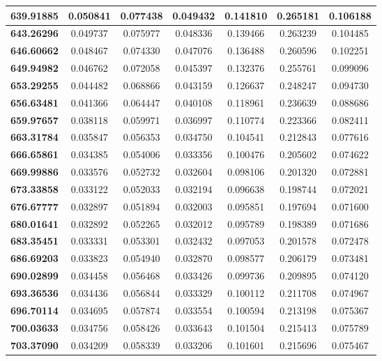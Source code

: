 \documentclass[10pt, a4paper]{article}
\begin{document}
\begin{appendices}
\begin{longtable}{|c|c|c|c|c|c|c|}
\textbf{639.91885} & 0.050841 & 0.077438 & 0.049432 & 0.141810 & 0.265181 & 0.106188 \\ \hline
\textbf{643.26296} & 0.049737 & 0.075977 & 0.048336 & 0.139466 & 0.263239 & 0.104485 \\ \hline
\textbf{646.60662} & 0.048467 & 0.074330 & 0.047076 & 0.136488 & 0.260596 & 0.102251 \\ \hline
\textbf{649.94982} & 0.046762 & 0.072058 & 0.045397 & 0.132376 & 0.255761 & 0.099096 \\ \hline
\textbf{653.29255} & 0.044482 & 0.068866 & 0.043159 & 0.126637 & 0.248247 & 0.094730 \\ \hline
\textbf{656.63481} & 0.041366 & 0.064447 & 0.040108 & 0.118961 & 0.236639 & 0.088686 \\ \hline
\textbf{659.97657} & 0.038118 & 0.059971 & 0.036997 & 0.110774 & 0.223366 & 0.082411 \\ \hline
\textbf{663.31784} & 0.035847 & 0.056353 & 0.034750 & 0.104541 & 0.212843 & 0.077616 \\ \hline
\textbf{666.65861} & 0.034385 & 0.054006 & 0.033356 & 0.100476 & 0.205602 & 0.074622 \\ \hline
\textbf{669.99886} & 0.033576 & 0.052732 & 0.032604 & 0.098106 & 0.201320 & 0.072881 \\ \hline
\textbf{673.33858} & 0.033122 & 0.052033 & 0.032194 & 0.096638 & 0.198744 & 0.072021 \\ \hline
\textbf{676.67777} & 0.032897 & 0.051894 & 0.032003 & 0.095851 & 0.197694 & 0.071600 \\ \hline
\textbf{680.01641} & 0.032892 & 0.052265 & 0.032012 & 0.095789 & 0.198389 & 0.071686 \\ \hline
\textbf{683.35451} & 0.033331 & 0.053301 & 0.032432 & 0.097053 & 0.201578 & 0.072478 \\ \hline
\textbf{686.69203} & 0.033823 & 0.054940 & 0.032870 & 0.098577 & 0.206179 & 0.073481 \\ \hline
\textbf{690.02899} & 0.034458 & 0.056468 & 0.033426 & 0.099736 & 0.209895 & 0.074120 \\ \hline
\textbf{693.36536} & 0.034436 & 0.056844 & 0.033329 & 0.100112 & 0.211708 & 0.074967 \\ \hline
\textbf{696.70114} & 0.034695 & 0.057874 & 0.033554 & 0.100594 & 0.213198 & 0.075367 \\ \hline
\textbf{700.03633} & 0.034756 & 0.058426 & 0.033643 & 0.101504 & 0.215413 & 0.075789 \\ \hline
\textbf{703.37090} & 0.034209 & 0.058339 & 0.033206 & 0.101601 & 0.215696 & 0.075467 \\ \hline

\end{longtable}
\end{appendices}
\end{document}
